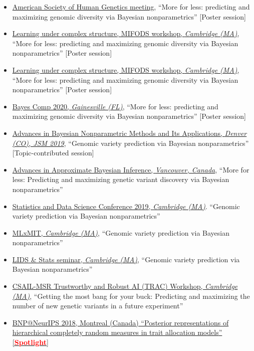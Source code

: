 \documentclass[10pt, a4paper]{article}
\newcommand{\years}[1]{\marginnote{\scriptsize #1}}
\begin{document}
\years{2020}
\begin{itemize}
 	\item \href{https://www.ashg.org/meetings/2020meeting}{American Society of Human Genetics meeting}, ``{More for less: predicting and maximizing genomic diversity via Bayesian nonparametrics}'' [Poster session] 
	\item \href{http://mifods.mit.edu/complex.php}{Learning under complex structure, MIFODS workshop, \emph{Cambridge (MA)}}, ``{More for less: predicting and maximizing genomic diversity via Bayesian nonparametrics}'' [Poster session] 
	\item \href{http://mifods.mit.edu/complex.php}{Learning under complex structure, MIFODS workshop, \emph{Cambridge (MA)}}, ``{More for less: predicting and maximizing genomic diversity via Bayesian nonparametrics}'' [Poster session] 
	\item \href{http://users.stat.ufl.edu/~jhobert/BayesComp2020/Conf_Website/}{Bayes Comp 2020, \emph{Gainesville (FL)}}, ``{More for less: predicting and maximizing genomic diversity via Bayesian nonparametrics}'' [Poster session] 
\end{itemize}
\years{2019} 
\begin{itemize} 
	\item \href{https://ww2.amstat.org/meetings/jsm/2019/onlineprogram/AbstractDetails.cfm?abstractid=304376}{Advances in Bayesian Nonparametric Methods and Its Applications, \emph{Denver (CO), JSM 2019}}, ``{Genomic variety prediction via Bayesian nonparametrics}'' [Topic-contributed session] 
	\item \href{https://ww2.amstat.org/meetings/jsm/2019/onlineprogram/AbstractDetails.cfm?abstractid=304376}{Advances in Approximate  Bayesian Inference, \emph{Vancouver, Canada}}, ``{More for less: Predicting and maximizing genetic variant discovery via Bayesian nonparametrics}'' 
	\item \href{https://sdsc2019.mit.edu/agenda/}{Statistics and Data Science Conference 2019, \emph{Cambridge (MA)}}. ``{Genomic variety prediction via Bayesian nonparametrics}'' 
	\item \href{https://mlxmit.mit.edu/ml-tea-talks}{MLxMIT, \emph{Cambridge (MA)}}, ``{Genomic variety prediction via Bayesian nonparametrics}''  
	\item \href{https://lids.mit.edu/news-and-events/events/lids-stats-tea-talk-tbd-0}{LIDS \& Stats seminar, \emph{Cambridge (MA)}}, ``{Genomic variety prediction via Bayesian nonparametrics}'' 
	\item \href{http://gradientscience.org/trac_workshop/}{CSAIL-MSR Trustworthy and Robust AI (TRAC) Workshop, \emph{Cambridge (MA)}}, ``{Getting the most bang for your buck: Predicting and maximizing the number of new genetic variants in a future experiment}'' 
\end{itemize}
\years{2018} 
\begin{itemize}
\item \href{https://sites.google.com/view/nipsbnp2018/accepted-papers}{BNP@NeurIPS 2018, Montreal (Canada) ``{Posterior representations of hierarchical completely random measures in trait allocation models}''  [\textcolor{red}{\textbf{Spotlight}}}]
\end{itemize}
\end{document}
